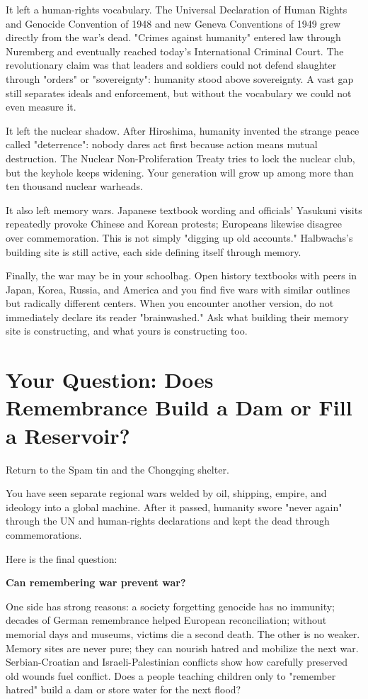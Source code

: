 It left a human-rights vocabulary. The Universal Declaration of Human Rights and Genocide Convention of 1948 and new Geneva Conventions of 1949 grew directly from the war's dead. "Crimes against humanity" entered law through Nuremberg and eventually reached today's International Criminal Court. The revolutionary claim was that leaders and soldiers could not defend slaughter through "orders" or "sovereignty": humanity stood above sovereignty. A vast gap still separates ideals and enforcement, but without the vocabulary we could not even measure it.

It left the nuclear shadow. After Hiroshima, humanity invented the strange peace called "deterrence": nobody dares act first because action means mutual destruction. The Nuclear Non-Proliferation Treaty tries to lock the nuclear club, but the keyhole keeps widening. Your generation will grow up among more than ten thousand nuclear warheads.

It also left memory wars. Japanese textbook wording and officials' Yasukuni visits repeatedly provoke Chinese and Korean protests; Europeans likewise disagree over commemoration. This is not simply "digging up old accounts." Halbwachs's building site is still active, each side defining itself through memory.

Finally, the war may be in your schoolbag. Open history textbooks with peers in Japan, Korea, Russia, and America and you find five wars with similar outlines but radically different centers. When you encounter another version, do not immediately declare its reader "brainwashed." Ask what building their memory site is constructing, and what yours is constructing too.

\section[Remembrance: Dam or Reservoir?]{Your Question: Does Remembrance Build a Dam or Fill a Reservoir?}
Return to the Spam tin and the Chongqing shelter.

You have seen separate regional wars welded by oil, shipping, empire, and ideology into a global machine. After it passed, humanity swore "never again" through the UN and human-rights declarations and kept the dead through commemorations.

Here is the final question:

\textbf{Can remembering war prevent war?}

One side has strong reasons: a society forgetting genocide has no immunity; decades of German remembrance helped European reconciliation; without memorial days and museums, victims die a second death. The other is no weaker. Memory sites are never pure; they can nourish hatred and mobilize the next war. Serbian-Croatian and Israeli-Palestinian conflicts show how carefully preserved old wounds fuel conflict. Does a people teaching children only to "remember hatred" build a dam or store water for the next flood?

